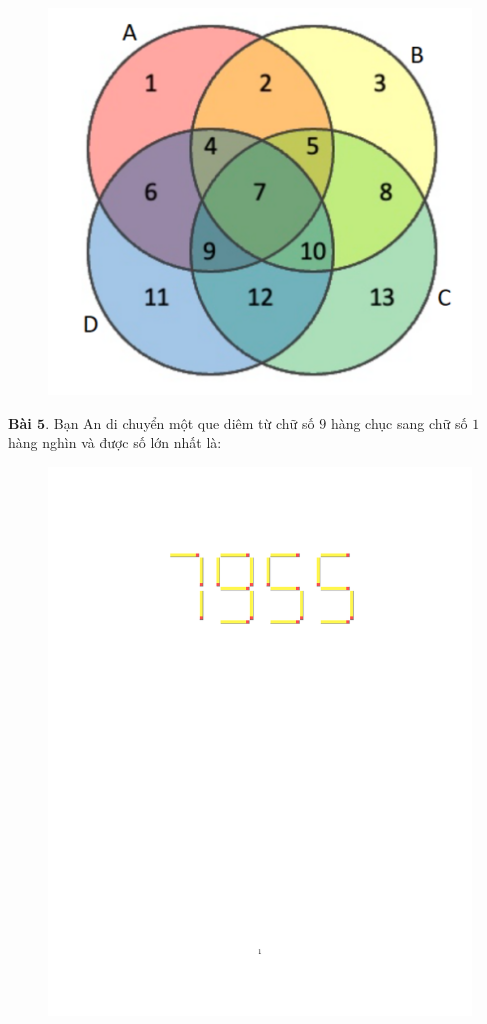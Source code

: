\begin{multicols}{2}
	\begin{figure}[H]
		\vspace*{-5pt}
		\centering
		\captionsetup{labelformat= empty, justification=centering}
		\includegraphics[width= 0.7\linewidth]{7}
		\vspace*{-10pt}
	\end{figure}
	\textbf{\color{toancuabi}Bài $\pmb{5.}$} Bạn An di chuyển một que diêm từ chữ số $9$ hàng chục sang chữ số $1$ hàng nghìn và được số lớn nhất là:  
	\begin{figure}[H]
		\vspace*{-5pt}
		\centering
		\captionsetup{labelformat= empty, justification=centering}
		\includegraphics[width= 1\linewidth]{8}

\end{figure}
\end{multicols}
